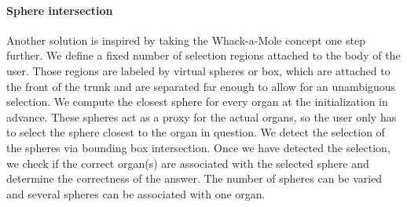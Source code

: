 \paragraph{Sphere intersection}
Another solution is inspired by taking the Whack-a-Mole concept one step further. We define a fixed number of selection regions attached to the body of the user. Those regions are labeled by virtual spheres or box, which are attached to the front of the trunk and are separated far enough to allow for an unambiguous selection. We compute the closest sphere for every organ at the initialization in advance. These spheres act as a proxy for the actual organs, so the user only has to select the sphere closest to the organ in question. 
We detect the selection of the spheres via bounding box intersection.
Once we have detected the selection, we check if the correct organ(s) are associated with the selected sphere and determine the correctness of the answer. The number of spheres can be varied and several spheres can be associated with one organ. 

